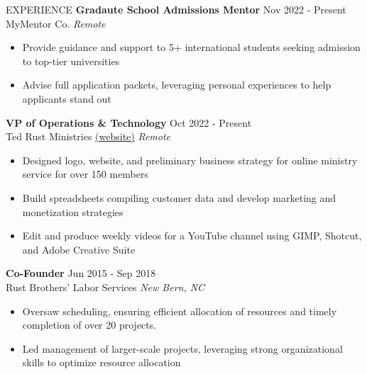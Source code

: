 \documentclass{resume} %
\begin{document}
\begin{rSection}{EXPERIENCE}
\textbf{Gradaute School Admissions Mentor} \hfill Nov 2022 - Present\\
MyMentor Co. \hfill \textit{Remote}
 \begin{itemize}
    \itemsep -3pt {} 
     \item Provide guidance and support to 5+ international students seeking admission to top-tier universities
     \item Advise full application packets, leveraging personal experiences to help applicants stand out
 \end{itemize}

\textbf{VP of Operations \& Technology} \hfill Oct 2022 - Present\\
Ted Rust Ministries \href{https://www.tedrust.com/}{(website)} \hfill \textit{Remote}
 \begin{itemize}
    \itemsep -3pt {} 
     \item Designed logo, website, and preliminary business strategy for online ministry service for over 150 members
     \item Build spreadsheets compiling customer data and develop marketing and monetization strategies
     \item Edit and produce weekly videos for a YouTube channel using GIMP, Shotcut, and Adobe Creative Suite
 \end{itemize}

\textbf{Co-Founder} \hfill Jun 2015 - Sep 2018\\
Rust Brothers' Labor Services \hfill \textit{New Bern, NC}
 \begin{itemize}
    \itemsep -3pt {} 
     \item Oversaw scheduling, ensuring efficient allocation of resources and timely completion of over 20 projects.
     \item Led management of larger-scale projects, leveraging strong organizational skills to optimize resource allocation
 \end{itemize}

\end{rSection} 

\end{document}
